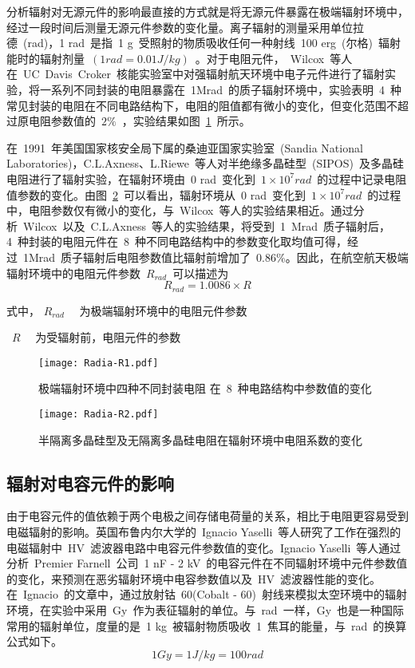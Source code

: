 分析辐射对无源元件的影响最直接的方式就是将无源元件暴露在极端辐射环境中，经过一段时间后测量无源元件参数的变化量。离子辐射的测量采用单位拉德~(rad)，1 rad~是指~1 g~受照射的物质吸收任何一种射线~100 erg~(尔格)~辐射能时的辐射剂量~$(1rad=0.01J/kg)$~。对于电阻元件，~Wilcox~等人在~UC~Davis~Croker~核能实验室中对强辐射航天环境中电子元件进行了辐射实验\cite{Wilcox2010Silicon}，将一系列不同封装的电阻暴露在~1Mrad~的质子辐射环境中，实验表明~4~种常见封装的电阻在不同电路结构下，电阻的阻值都有微小的变化，但变化范围不超过原电阻参数值的~$2\%$~，实验结果如图~\ref{fig:chap2:radia-r1}~所示。

在~1991~年美国国家核安全局下属的桑迪亚国家实验室~(Sandia National Laboratories)，C.L.Axness、L.Riewe~等人对半绝缘多晶硅型~(SIPOS)~及多晶硅电阻进行了辐射实验\cite{Axness1991Radiation}，在辐射环境由~0 rad~变化到~$1\times 10^7rad$~的过程中记录电阻值参数的变化。由图~\ref{fig:chap2:radia-r2}~可以看出，辐射环境从~0 rad~变化到~$1\times 10^7rad$~的过程中，电阻参数仅有微小的变化，与~Wilcox~等人的实验结果相近。通过分析~Wilcox~以及~C.L.Axness~等人的实验结果，将受到~1~Mrad~质子辐射后，4~种封装的电阻元件在~8~种不同电路结构中的参数变化取均值可得，经过~1Mrad~质子辐射后电阻参数值比辐射前增加了~$0.86\%$。因此，在航空航天极端辐射环境中的电阻元件参数~$R_{rad}$~可以描述为
\begin{equation}\label{equ:chap2:Index6}
  R_{rad}=1.0086\times R
\end{equation}

式中，  $R_{rad}$  ~~为极端辐射环境中的电阻元件参数

\hspace{1.3cm}~$R$ ~\quad ~为受辐射前，电阻元件的参数

\begin{figure}[h]
  \centering
     \texttt{[image: Radia-R1.pdf]}\\
   \caption{极端辐射环境中四种不同封装电阻
在~8~种电路结构中参数值的变化}\label{fig:chap2:radia-r1}
\end{figure}
\begin{figure}[h]
  \centering
     \texttt{[image: Radia-R2.pdf]}\\
   \caption{半隔离多晶硅型及无隔离多晶硅电阻在辐射环境中电阻系数的变化}\label{fig:chap2:radia-r2}
\end{figure}
\subsection{辐射对电容元件的影响}
由于电容元件的值依赖于两个电极之间存储电荷量的关系，相比于电阻更容易受到电磁辐射的影响。英国布鲁内尔大学的~Ignacio Yaselli~等人研究了工作在强烈的电磁辐射中~HV~滤波器电路中电容元件参数值的变化\cite{Yaselli2008Studying}。Ignacio Yaselli~等人通过分析~Premier Farnell~公司~1 nF - 2 kV~的电容元件在不同辐射环境中元件参数值的变化，来预测在恶劣辐射环境中电容参数值以及~HV~滤波器性能的变化。在~Ignacio~的文章中，通过放射钴~60(Cobalt - 60)~射线来模拟太空环境中的辐射环境，在实验中采用~Gy~作为表征辐射的单位。与~rad~一样，Gy~也是一种国际常用的辐射单位，度量的是~1 kg~被辐射物质吸收~1~焦耳的能量，与~rad~的换算公式如下。
\begin{equation}\label{equ:chap2:Index7}
  1Gy=1J/kg=100rad
\end{equation}

